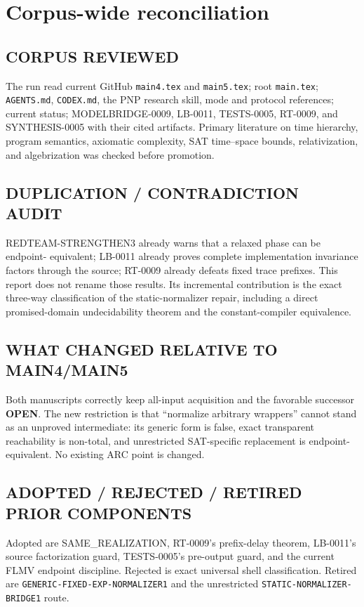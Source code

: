 \documentclass[11pt]{article}
\newcommand{\OPEN}{\textbf{OPEN}}
\begin{document}
\section{Corpus-wide reconciliation}

\subsection*{CORPUS REVIEWED}
The run read current GitHub \texttt{main4.tex} and \texttt{main5.tex}; root
\texttt{main.tex}; \texttt{AGENTS.md}, \texttt{CODEX.md}, the PNP research
skill, mode and protocol references; current status; MODELBRIDGE-0009,
LB-0011, TESTS-0005, RT-0009, and SYNTHESIS-0005 with their cited artifacts.
Primary literature on time hierarchy, program semantics, axiomatic complexity,
SAT time--space bounds, relativization, and algebrization was checked before
promotion.

\subsection*{DUPLICATION / CONTRADICTION AUDIT}
REDTEAM-STRENGTHEN3 already warns that a relaxed phase can be endpoint-
equivalent; LB-0011 already proves complete implementation invariance factors
through the source; RT-0009 already defeats fixed trace prefixes.  This report
does not rename those results.  Its incremental contribution is the exact
three-way classification of the static-normalizer repair, including a direct
promised-domain undecidability theorem and the constant-compiler equivalence.

\subsection*{WHAT CHANGED RELATIVE TO MAIN4/MAIN5}
Both manuscripts correctly keep all-input acquisition and the favorable
successor \OPEN.  The new restriction is that ``normalize arbitrary wrappers''
cannot stand as an unproved intermediate: its generic form is false, exact
transparent reachability is non-total, and unrestricted SAT-specific
replacement is endpoint-equivalent.  No existing ARC point is changed.

\subsection*{ADOPTED / REJECTED / RETIRED PRIOR COMPONENTS}
Adopted are SAME\_REALIZATION, RT-0009's prefix-delay theorem, LB-0011's source
factorization guard, TESTS-0005's pre-output guard, and the current FLMV
endpoint discipline.  Rejected is exact universal shell classification.
Retired are \texttt{GENERIC-FIXED-EXP-NORMALIZER1} and the unrestricted
\texttt{STATIC-NORMALIZER-BRIDGE1} route.
\end{document}
